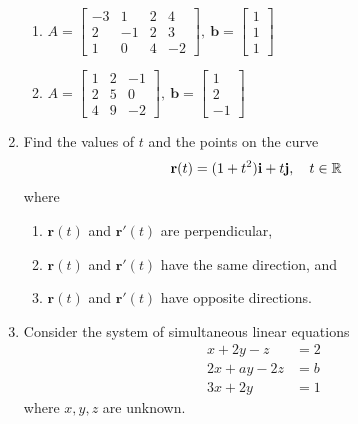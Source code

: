 \documentclass{article}
\begin{document}
\begin{enumerate}
\begin{enumerate}
\item \(
 A = \begin{bmatrix}
  -3 &  1 & 2 &  4 \\
   2 & -1 & 2 &  3 \\
   1 &  0 & 4 & -2
 \end{bmatrix}, \ 
 \mathbf{b} = \begin{bmatrix} 1 \\ 1 \\ 1 \end{bmatrix}
\)
\item \( A = \begin{bmatrix}
 1 & 2 & -1 \\
 2 & 5 & 0 \\
 4 & 9 & -2
\end{bmatrix} , \ 
 \mathbf{b} =
\begin{bmatrix} 1 \\ 2 \\ -1 \end{bmatrix} \)
\end{enumerate}

\item 
Find the values of $t$ and the points on the curve 
\begin{align*}
  \mathbf{r}(t) &= (1+t^2) \mathbf{i} + t\mathbf{j}, \quad t\in \mathbb{R}
\end{align*}
where
\begin{enumerate}
  \item $\mathbf{r}(t)$ and $\mathbf{r}'(t)$ are perpendicular,
  \item $\mathbf{r}(t)$ and $\mathbf{r}'(t)$ have the same direction, and
  \item $\mathbf{r}(t)$ and $\mathbf{r}'(t)$ have opposite directions.   
\end{enumerate}

\item 

Consider the system of simultaneous linear equations
\begin{align*}
  x + 2y -  z &= 2 \\
 2x + ay - 2z &= b \\
 3x + 2y      &= 1
\end{align*}
where $x, y, z$ are unknown.


\end{enumerate}
\end{document}
